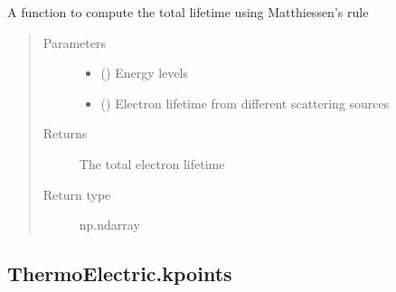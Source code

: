 \documentclass[letterpaper,10pt,english]{sphinxmanual}
\begin{document}
\begin{fulllineitems}
\label{\detokenize{autosummary/ThermoElectric.matthiessen:ThermoElectric.matthiessen}}
\sphinxAtStartPar
A function to compute the total lifetime using Matthiessen’s rule
\begin{quote}\begin{description}
\item[{Parameters}] \leavevmode\begin{itemize}
\item {} 
\sphinxAtStartPar
{} () \textendash{} Energy levels

\item {} 
\sphinxAtStartPar
{} () \textendash{} Electron lifetime from different scattering sources

\end{itemize}

\item[{Returns}] \leavevmode
\sphinxAtStartPar
{} \textendash{} The total electron lifetime

\item[{Return type}] \leavevmode
\sphinxAtStartPar
np.ndarray

\end{description}\end{quote}

\end{fulllineitems}



\subsection{ThermoElectric.kpoints}
\label{\detokenize{autosummary/ThermoElectric.kpoints:thermoelectric-kpoints}}\label{\detokenize{autosummary/ThermoElectric.kpoints::doc}}
\end{document}
